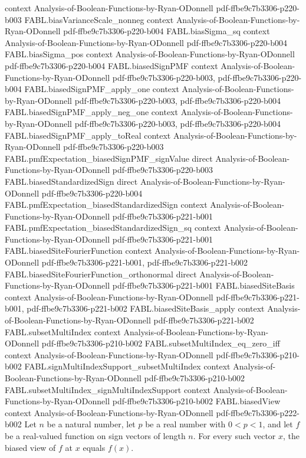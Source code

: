 \begin{theorem}
  {context}
  {Analysis-of-Boolean-Functions-by-Ryan-ODonnell}
  {pdf-ffbe9c7b3306-p220-b003}
\proofstep
  {FABL.biasVarianceScale_nonneg}
  {context}
  {Analysis-of-Boolean-Functions-by-Ryan-ODonnell}
  {pdf-ffbe9c7b3306-p220-b004}
\proofstep
  {FABL.biasSigma_sq}
  {context}
  {Analysis-of-Boolean-Functions-by-Ryan-ODonnell}
  {pdf-ffbe9c7b3306-p220-b004}
\proofstep
  {FABL.biasSigma_pos}
  {context}
  {Analysis-of-Boolean-Functions-by-Ryan-ODonnell}
  {pdf-ffbe9c7b3306-p220-b004}
\proofstep
  {FABL.biasedSignPMF}
  {context}
  {Analysis-of-Boolean-Functions-by-Ryan-ODonnell}
  {pdf-ffbe9c7b3306-p220-b003,
    pdf-ffbe9c7b3306-p220-b004}
\proofstep
  {FABL.biasedSignPMF_apply_one}
  {context}
  {Analysis-of-Boolean-Functions-by-Ryan-ODonnell}
  {pdf-ffbe9c7b3306-p220-b003,
    pdf-ffbe9c7b3306-p220-b004}
\proofstep
  {FABL.biasedSignPMF_apply_neg_one}
  {context}
  {Analysis-of-Boolean-Functions-by-Ryan-ODonnell}
  {pdf-ffbe9c7b3306-p220-b003,
    pdf-ffbe9c7b3306-p220-b004}
\proofstep
  {FABL.biasedSignPMF_apply_toReal}
  {context}
  {Analysis-of-Boolean-Functions-by-Ryan-ODonnell}
  {pdf-ffbe9c7b3306-p220-b003}
\proofstep
  {FABL.pmfExpectation_biasedSignPMF_signValue}
  {direct}
  {Analysis-of-Boolean-Functions-by-Ryan-ODonnell}
  {pdf-ffbe9c7b3306-p220-b003}
\proofstep
  {FABL.biasedStandardizedSign}
  {direct}
  {Analysis-of-Boolean-Functions-by-Ryan-ODonnell}
  {pdf-ffbe9c7b3306-p220-b004}
\proofstep
  {FABL.pmfExpectation_biasedStandardizedSign}
  {context}
  {Analysis-of-Boolean-Functions-by-Ryan-ODonnell}
  {pdf-ffbe9c7b3306-p221-b001}
\proofstep
  {FABL.pmfExpectation_biasedStandardizedSign_sq}
  {context}
  {Analysis-of-Boolean-Functions-by-Ryan-ODonnell}
  {pdf-ffbe9c7b3306-p221-b001}
\proofstep
  {FABL.biasedSiteFourierFunction}
  {context}
  {Analysis-of-Boolean-Functions-by-Ryan-ODonnell}
  {pdf-ffbe9c7b3306-p221-b001,
    pdf-ffbe9c7b3306-p221-b002}
\proofstep
  {FABL.biasedSiteFourierFunction_orthonormal}
  {direct}
  {Analysis-of-Boolean-Functions-by-Ryan-ODonnell}
  {pdf-ffbe9c7b3306-p221-b001}
\proofstep
  {FABL.biasedSiteBasis}
  {context}
  {Analysis-of-Boolean-Functions-by-Ryan-ODonnell}
  {pdf-ffbe9c7b3306-p221-b001,
    pdf-ffbe9c7b3306-p221-b002}
\proofstep
  {FABL.biasedSiteBasis_apply}
  {context}
  {Analysis-of-Boolean-Functions-by-Ryan-ODonnell}
  {pdf-ffbe9c7b3306-p221-b002}
\proofstep
  {FABL.subsetMultiIndex}
  {context}
  {Analysis-of-Boolean-Functions-by-Ryan-ODonnell}
  {pdf-ffbe9c7b3306-p210-b002}
\proofstep
  {FABL.subsetMultiIndex_eq_zero_iff}
  {context}
  {Analysis-of-Boolean-Functions-by-Ryan-ODonnell}
  {pdf-ffbe9c7b3306-p210-b002}
\proofstep
  {FABL.signMultiIndexSupport_subsetMultiIndex}
  {context}
  {Analysis-of-Boolean-Functions-by-Ryan-ODonnell}
  {pdf-ffbe9c7b3306-p210-b002}
\proofstep
  {FABL.subsetMultiIndex_signMultiIndexSupport}
  {context}
  {Analysis-of-Boolean-Functions-by-Ryan-ODonnell}
  {pdf-ffbe9c7b3306-p210-b002}
\proofstep
  {FABL.biasedView}
  {context}
  {Analysis-of-Boolean-Functions-by-Ryan-ODonnell}
  {pdf-ffbe9c7b3306-p222-b002}
Let $n$ be a natural number, let $p$ be a real number with $0<p<1$, and let $f$ be a
real-valued function on sign vectors of length $n$. For every such vector $x$, the
biased view of $f$ at $x$ equals $f(x)$.
\end{theorem}

